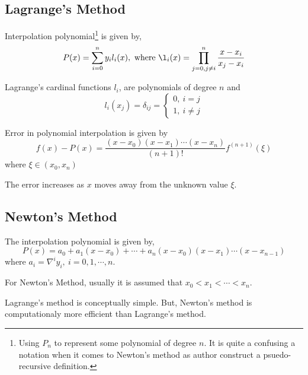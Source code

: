 \subsection{Lagrange's Method}
Interpolation polynomial\footnote{Using $P_n$ to represent some polynomial of degree $n$. It is quite a confusing a notation when it comes to Newton's method as author construct a psuedo-recursive definition.} is given by,
\begin{equation}
	P(x) = \sum_{i=0}^n y_i l_i(x),\text{ where } \l_i(x) = \prod_{j = 0,j \ne i}^n \frac{x-x_i}{x_j-x_i}
	\label{equ:lagrange}
\end{equation}
\begin{remark}
	Lagrange's cardinal functions $l_i$, are polynomials of degree $n$ and
	$$l_i(x_j) = \delta_{ij} = \begin{cases} 0,\ i = j \\ 1,\ i \ne j \end{cases}$$
\end{remark}
\begin{proposition}
	Error in polynomial interpolation is given by
	\begin{equation}
		f(x) - P(x) = \frac{(x-x_0)(x-x_1)\cdots(x-x_n)}{(n+1)!} f^{(n+1)}(\xi)
		\label{equ:error}
	\end{equation}
	where $\xi \in (x_0, x_n)$
\end{proposition}
\begin{remark}
	The error increases as $x$ moves away from the unknown value $\xi$.
\end{remark}

\subsection{Newton's Method}
The interpolation polynomial is given by,
\begin{equation}
	P(x) = a_0 + a_1(x-x_0) + \cdots + a_n(x-x_0)(x-x_1)\cdots(x-x_{n-1})
	\label{equ:newton}
\end{equation}
where $a_i = \nabla^i y_i,\ i = 0,1,\cdots,n$.
\begin{remark}
	For Newton's Method, usually it is assumed that $x_0 < x_1 < \cdots < x_n$.
\end{remark}
\begin{remark}
	 Lagrange's method is conceptually simple. But, Newton's method is computationaly more efficient than Lagrange's method.
\end{remark}
